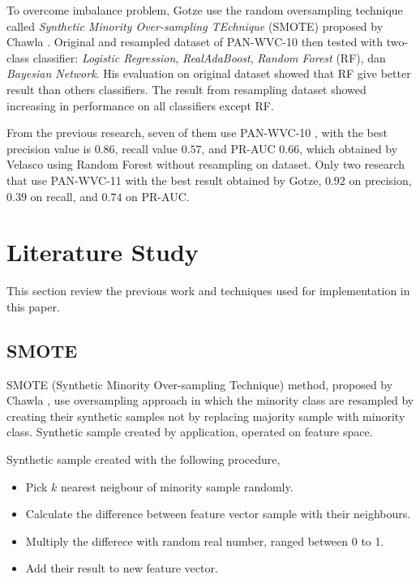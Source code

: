 \documentclass[conference,compsoc,a4paper,twocolumn,final]{IEEEtran}
\begin{document}
To overcome imbalance problem, Gotze use the random oversampling technique
called
\textit{Synthetic Minority Over-sampling TEchnique} (SMOTE)
proposed by Chawla
\cite{chawla2002smote}.
Original and resampled dataset of PAN-WVC-10 then tested with two-class
classifier:
\textit{Logistic Regression},
\textit{RealAdaBoost},
\textit{Random Forest} (RF), dan
\textit{Bayesian Network}.
His evaluation on original dataset showed that RF give better result than
others classifiers.
The result from resampling dataset showed increasing in performance on all
classifiers except RF.

From the previous research, seven of them use PAN-WVC-10
\cite{adler2010detecting}
\cite{adler2011wikipedia}
\cite{gotze2014advanced}
\cite{harpalani2011language}
\cite{mola2012wikipedia}
\cite{wang2010got}
\cite{west2011multilingual},
with the best precision value is $0.86$, recall value $0.57$, and PR-AUC
$0.66$, which obtained by Velasco using Random Forest without resampling on
dataset.
Only two research that use PAN-WVC-11
\cite{gotze2014advanced}
\cite{west2011multilingual}
with the best result obtained by Gotze, $0.92$ on precision, $0.39$
on recall, and $0.74$ on PR-AUC.

\section{Literature Study}
\label{section:literature_study}

This section review the previous work and techniques used for implementation in
this paper.

\subsection{SMOTE}
\label{subsection:smote}

SMOTE (Synthetic Minority Over-sampling Technique) method, proposed by Chawla
\cite{chawla2002smote},
use oversampling approach in which the minority class are resampled by creating
their synthetic samples not by replacing majority sample with minority class.
Synthetic sample created by application, operated on feature space.

Synthetic sample created with the following procedure,
\begin{itemize}
\item Pick $k$ nearest neigbour of minority sample randomly.
\item Calculate the difference between feature vector sample with their
neighbours.
\item Multiply the differece with random real number, ranged between 0 to 1.
\item Add their result to new feature vector.
\end{itemize}
\end{document}
